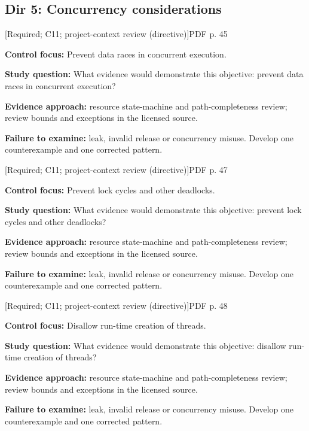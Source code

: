 \documentclass[10pt,letterpaper]{article}
\begin{document}
\subsection{Dir 5: Concurrency considerations}
 \textsf{\footnotesize [Required; C11; project-context review (directive)]}\hfill{\footnotesize PDF p. 45}\par
\textbf{Control focus:} Prevent data races in concurrent execution.\par
\textbf{Study question:} What evidence would demonstrate this objective: prevent data races in concurrent execution?\par
\textbf{Evidence approach:} resource state-machine and path-completeness review; review bounds and exceptions in the licensed source.\par
\textbf{Failure to examine:} leak, invalid release or concurrency misuse. Develop one counterexample and one corrected pattern.\par
\smallskip
{}
 \textsf{\footnotesize [Required; C11; project-context review (directive)]}\hfill{\footnotesize PDF p. 47}\par
\textbf{Control focus:} Prevent lock cycles and other deadlocks.\par
\textbf{Study question:} What evidence would demonstrate this objective: prevent lock cycles and other deadlocks?\par
\textbf{Evidence approach:} resource state-machine and path-completeness review; review bounds and exceptions in the licensed source.\par
\textbf{Failure to examine:} leak, invalid release or concurrency misuse. Develop one counterexample and one corrected pattern.\par
\smallskip
{}
 \textsf{\footnotesize [Required; C11; project-context review (directive)]}\hfill{\footnotesize PDF p. 48}\par
\textbf{Control focus:} Disallow run-time creation of threads.\par
\textbf{Study question:} What evidence would demonstrate this objective: disallow run-time creation of threads?\par
\textbf{Evidence approach:} resource state-machine and path-completeness review; review bounds and exceptions in the licensed source.\par
\textbf{Failure to examine:} leak, invalid release or concurrency misuse. Develop one counterexample and one corrected pattern.\par
\smallskip
\end{document}
